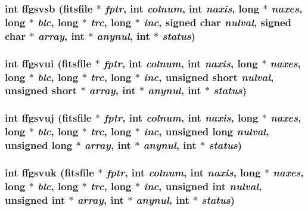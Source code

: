 \subsubsection{\setlength{\rightskip}{0pt plus 5cm}int ffgsvsb (\bf{fitsfile} $\ast$ {\em fptr}, int {\em colnum}, int {\em naxis}, long $\ast$ {\em naxes}, long $\ast$ {\em blc}, long $\ast$ {\em trc}, long $\ast$ {\em inc}, signed char {\em nulval}, signed char $\ast$ {\em array}, int $\ast$ {\em anynul}, int $\ast$ {\em status})}\label{src_2fitsio_8h_9b640c1b98ee1cca47986fc97e10171e}


\subsubsection{\setlength{\rightskip}{0pt plus 5cm}int ffgsvui (\bf{fitsfile} $\ast$ {\em fptr}, int {\em colnum}, int {\em naxis}, long $\ast$ {\em naxes}, long $\ast$ {\em blc}, long $\ast$ {\em trc}, long $\ast$ {\em inc}, unsigned short {\em nulval}, unsigned short $\ast$ {\em array}, int $\ast$ {\em anynul}, int $\ast$ {\em status})}\label{src_2fitsio_8h_87ccfd30c50f2289bde69e5d88519f19}


\subsubsection{\setlength{\rightskip}{0pt plus 5cm}int ffgsvuj (\bf{fitsfile} $\ast$ {\em fptr}, int {\em colnum}, int {\em naxis}, long $\ast$ {\em naxes}, long $\ast$ {\em blc}, long $\ast$ {\em trc}, long $\ast$ {\em inc}, unsigned long {\em nulval}, unsigned long $\ast$ {\em array}, int $\ast$ {\em anynul}, int $\ast$ {\em status})}\label{src_2fitsio_8h_5216e5258326fde9ddb6bc20a82e1070}


\subsubsection{\setlength{\rightskip}{0pt plus 5cm}int ffgsvuk (\bf{fitsfile} $\ast$ {\em fptr}, int {\em colnum}, int {\em naxis}, long $\ast$ {\em naxes}, long $\ast$ {\em blc}, long $\ast$ {\em trc}, long $\ast$ {\em inc}, unsigned int {\em nulval}, unsigned int $\ast$ {\em array}, int $\ast$ {\em anynul}, int $\ast$ {\em status})}\label{src_2fitsio_8h_2c12cc51e3a9ae09a587cad9d58ceb22}


